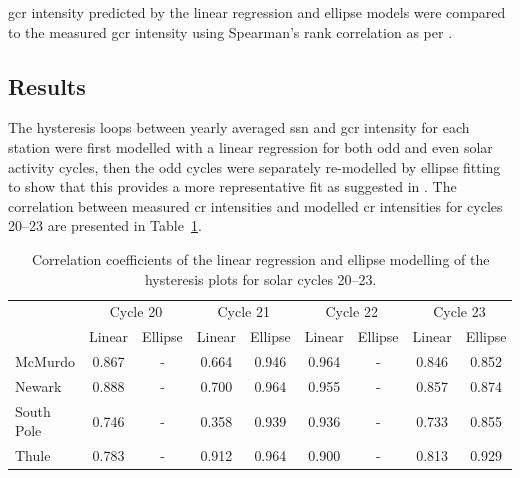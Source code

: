 \gls{gcr} intensity predicted by the linear regression and ellipse models were compared to the measured \gls{gcr} intensity using Spearman's rank correlation as per \citet{inceoglu_modeling_2014}.


\subsection{Results}

The hysteresis loops between yearly averaged \gls{ssn} and \gls{gcr} intensity for each station were first modelled with a linear regression for both odd and even solar activity cycles, then the odd cycles were separately re-modelled by ellipse fitting to show that this provides a more representative fit as suggested in \cite{inceoglu_modeling_2014}. The correlation between measured \gls{cr} intensities and modelled \gls{cr} intensities for cycles 20--23 are presented in Table~\ref{table:hysteresis_20-23}.

\vspace{1em}

\begin{table}[!ht]
	\begin{center}
	\caption{Correlation coefficients of the linear regression and ellipse modelling of the hysteresis plots for solar cycles 20--23.}
	\label{table:hysteresis_20-23}
	\begin{tabular}{l c c c c c c c c}
		\hline 
		{} & \multicolumn{2}{c}{Cycle 20} & \multicolumn{2}{c}{Cycle 21} & \multicolumn{2}{c}{Cycle 22} & \multicolumn{2}{c}{Cycle 23}\\
		{} & {Linear} & {Ellipse} & {Linear} & {Ellipse} & {Linear} & {Ellipse} & {Linear} & {Ellipse}\\ \hline
		{McMurdo} & {0.867} & {-} & {0.664} & {0.946} & {0.964} & {-} & {0.846} & {0.852} \\
		{Newark} & {0.888} & {-} & {0.700} & {0.964} & {0.955} & {-} & {0.857} & {0.874} \\
		{South Pole} & {0.746} & {-} & {0.358} & {0.939} & {0.936} & {-} & {0.733} & {0.855} \\
		{Thule} & {0.783} & {-} & {0.912} & {0.964}  & {0.900} & {-} & {0.813} & {0.929}\\ \hline
	\end{tabular}
	\end{center}
\end{table}

